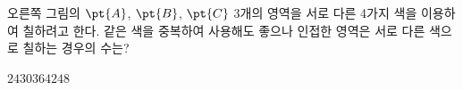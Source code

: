 \noindent\begin{minipage}[t]{0.58\linewidth}\vspace{0pt}\raggedright 오른쪽 그림의 $\pt{A}$, $\pt{B}$, $\pt{C}$ 3개의 영역을 서로 다른 4가지 색을 이용하여 칠하려고 한다. 같은 색을 중복하여 사용해도 좋으나 인접한 영역은 서로 다른 색으로 칠하는 경우의 수는? \end{minipage}\hfill\begin{minipage}[t]{0.4\linewidth}\vspace{0pt}\centering \resizebox{\ifdim\width>\linewidth\linewidth\else\width\fi}{!}{}\end{minipage}\par
\begin{choices32}{$24$}{$30$}{$36$}{$42$}{$48$}\end{choices32}
